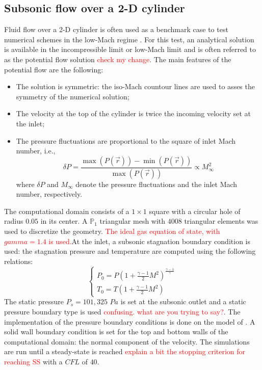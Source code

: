 \documentclass[preprint,10pt]{elsarticle}
\newcommand{\tcr}[1]{\textcolor{red}{#1}}
\begin{document}
\subsection{Subsonic flow over a 2-D cylinder} \label{sec:cylinder}

Fluid flow over a 2-D cylinder is often used as a benchmark case to test numerical schemes in the low-Mach regime \cite{I suppose some guillard papers, but many others as well}. For this test, an analytical solution is available in the incompressible limit or low-Mach limit and is often referred to as the potential flow solution \tcr{check my change}. The main features of the potential flow are the following:
%
\begin{itemize}
\item The solution is symmetric: the iso-Mach countour lines are used to asses the symmetry of the numerical solution;
\item The velocity at the top of the cylinder is twice the incoming velocity set at the inlet;
\item The pressure fluctuations are proportional to the square of inlet Mach number, i.e., 
\begin{equation}
\delta P = \frac{\max(P(\vec{r})) - \min(P(\vec{r}))}{\max(P(\vec{r}))}  \propto M_\infty^2
\end{equation}
where $\delta P$ and $M_\infty$ denote the pressure fluctuations and the inlet Mach number, respectively.
\end{itemize}
%
The computational domain consists of a $1\times 1$ square with a circular hole of radius $0.05$ in its center. A $\mathbb{P}_1$ triangular mesh with $4008$ triangular elements was used to discretize the geometry. \tcr{The ideal gas equation of state, with $gamma=1.4$ is used.}At the inlet, a subsonic stagnation boundary condition is used: the stagnation pressure and temperature are computed using the following relations:
%
\begin{equation}
\label{eq:stagnation_relations}
\left\{
\begin{array}{l}
P_0 = P\left( 1 + \frac{\gamma-1}{2} M^2 \right)^{\frac{\gamma-1}{\gamma}} \\
T_0 = T\left( 1 + \frac{\gamma-1}{2} M^2 \right)
\end{array}
\right.
\end{equation}
%
The static pressure $P_s = 101,325$ $Pa$ is set at the subsonic outlet and a static pressure boundary type is used \tcr{confusing. what are you trying to say?}. The implementation of the pressure boundary conditions is done on the model of \cite{SEM}. A solid wall boundary condition is set for the top and bottom walls of the computational domain: the normal component of the velocity. The simulations are run until a steady-state is reached \tcr{explain a bit the stopping criterion for reaching SS} with a $CFL$ of $40$.
\end{document}
